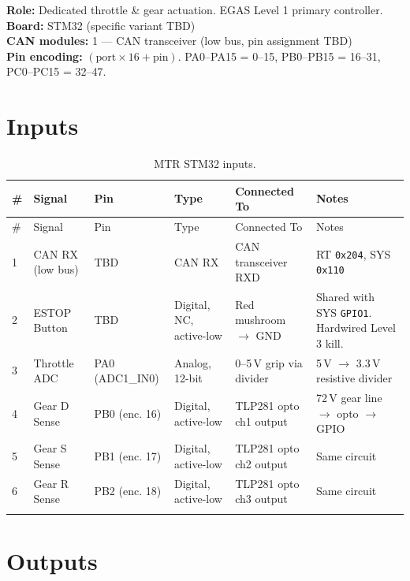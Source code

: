 \documentclass[12pt,a4paper,oneside]{report}
\newcommand{\canid}[1]{\texttt{0x#1}}
\newcommand{\gpio}[1]{\texttt{GPIO#1}}
\begin{document}
\textbf{Role:} Dedicated throttle \& gear actuation. EGAS Level 1 primary controller.\\
\textbf{Board:} STM32 (specific variant TBD)\\
\textbf{CAN modules:} 1 --- CAN transceiver (low bus, pin assignment TBD)\\
\textbf{Pin encoding:} $(\text{port} \times 16 + \text{pin})$. PA0--PA15 = 0--15, PB0--PB15 = 16--31, PC0--PC15 = 32--47.

\section{Inputs}

\begin{center}
\begin{longtable}{p{4mm} p{30mm} p{28mm} p{26mm} p{26mm} p{36mm}}
\toprule
\# & Signal & Pin & Type & Connected To & Notes \\
\midrule
\endfirsthead
\toprule
\# & Signal & Pin & Type & Connected To & Notes \\
\midrule
\endhead
1 & CAN RX (low bus) & TBD          & CAN RX    & CAN transceiver RXD & RT \canid{204}, SYS \canid{110} \\
2 & ESTOP Button     & TBD          & Digital, NC, active-low & Red mushroom $\rightarrow$ GND & Shared with SYS \gpio{1}. Hardwired Level 3 kill. \\
3 & Throttle ADC     & PA0 (ADC1\_IN0) & Analog, 12-bit & 0--5\,V grip via divider & 5\,V $\rightarrow$ 3.3\,V resistive divider \\
4 & Gear D Sense     & PB0 (enc. 16)& Digital, active-low & TLP281 opto ch1 output & 72\,V gear line $\rightarrow$ opto $\rightarrow$ GPIO \\
5 & Gear S Sense     & PB1 (enc. 17)& Digital, active-low & TLP281 opto ch2 output & Same circuit \\
6 & Gear R Sense     & PB2 (enc. 18)& Digital, active-low & TLP281 opto ch3 output & Same circuit \\
\bottomrule
\caption{MTR STM32 inputs.}
\end{longtable}
\end{center}

\section{Outputs}
\end{document}
